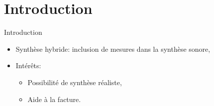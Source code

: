 \section*{Introduction}
\begin{frame}{Introduction}

\begin{itemize}
  \item Synthèse hybride: inclusion de mesures dans la synthèse sonore,
  \item Intérêts: 
  \begin{itemize}
      \item Possibilité de synthèse réaliste,
      \item Aide à la facture.
  \end{itemize}
\end{itemize}

\end{frame}
